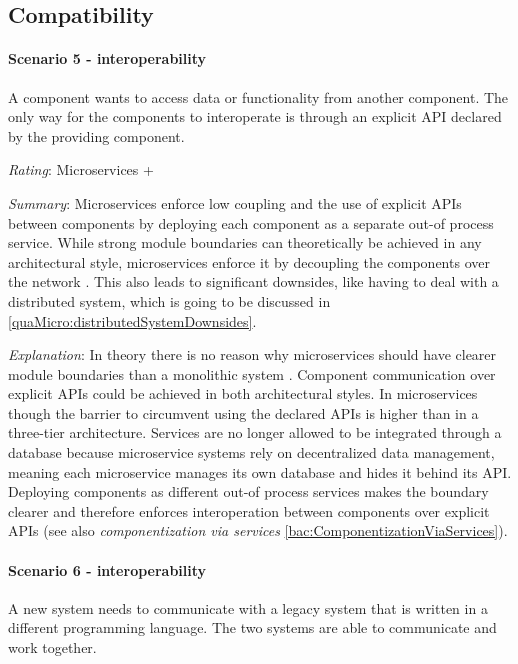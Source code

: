 \subsection{Compatibility}
\label{quaMicro:compatibility}
\paragraph{Scenario 5 - interoperability} A component wants to access data or functionality from another component.
The only way for the components to interoperate is through an explicit \ac{API} declared by the providing component.
\label{quaMicro:s5}

\textit{Rating}: Microservices +

\textit{Summary}: Microservices enforce low coupling and the use of explicit \ac{API}s between components by deploying each component as a separate out-of process service.
While strong module boundaries can theoretically be achieved in any architectural style, microservices enforce it by decoupling the components over the network \cite{FowlerTradeoffsBoundaries2015}. 
This also leads to significant downsides, like having to deal with a distributed system, which is going to be discussed in \ref{quaMicro:distributedSystemDownsides}.

\textit{Explanation}:
In theory there is no reason why microservices should have clearer module boundaries than a monolithic system \cite{FowlerTradeoffsBoundaries2015}.
Component communication over explicit \ac{API}s could be achieved in both architectural styles.
In microservices though the barrier to circumvent using the declared \ac{API}s is higher than in a three-tier architecture\cite{FowlerTradeoffsBoundaries2015}.
Services are no longer allowed to be integrated through a database because microservice systems rely on decentralized data management, meaning each microservice manages its own database and hides it behind its \ac{API}.
Deploying components as different out-of process services makes the boundary clearer and therefore enforces interoperation between components over explicit \ac{API}s (see also \textit{componentization via services} \ref{bac:ComponentizationViaServices}).

\paragraph{Scenario 6 - interoperability} 
A new system needs to communicate with a legacy system that is written in a different programming language. The two systems are able to communicate and work together.
\label{quaMicro:s6}

